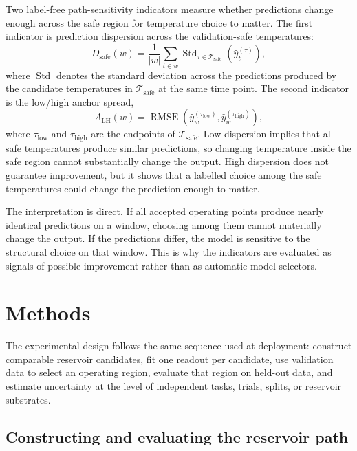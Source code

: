 \documentclass[11pt,a4paper]{article}
\begin{document}
Two label-free path-sensitivity indicators measure whether predictions change enough across the safe region for temperature choice to matter. The first indicator is prediction dispersion across the validation-safe temperatures:
\begin{equation}
  D_{\mathrm{safe}}(w)=
  \frac{1}{|w|}\sum_{t\in w}
  \operatorname{Std}_{\tau\in\mathcal{T}_{\mathrm{safe}}}
  \left(\widehat y_t^{(\tau)}\right),
\end{equation}
where $\operatorname{Std}$ denotes the standard deviation across the predictions produced by the candidate temperatures in $\mathcal{T}_{\mathrm{safe}}$ at the same time point. The second indicator is the low/high anchor spread,
\begin{equation}
  A_{\mathrm{LH}}(w)=
  \operatorname{RMSE}\left(
  \widehat y_{w}^{(\tau_{\mathrm{low}})},
  \widehat y_{w}^{(\tau_{\mathrm{high}})}
  \right),
\end{equation}
where $\tau_{\mathrm{low}}$ and $\tau_{\mathrm{high}}$ are the endpoints of $\mathcal{T}_{\mathrm{safe}}$. Low dispersion implies that all safe temperatures produce similar predictions, so changing temperature inside the safe region cannot substantially change the output. High dispersion does not guarantee improvement, but it shows that a labelled choice among the safe temperatures could change the prediction enough to matter.

The interpretation is direct. If all accepted operating points produce nearly identical predictions on a window, choosing among them cannot materially change the output. If the predictions differ, the model is sensitive to the structural choice on that window. This is why the indicators are evaluated as signals of possible improvement rather than as automatic model selectors.

\section{Methods}
\label{sec:methods}

The experimental design follows the same sequence used at deployment: construct comparable reservoir candidates, fit one readout per candidate, use validation data to select an operating region, evaluate that region on held-out data, and estimate uncertainty at the level of independent tasks, trials, splits, or reservoir substrates.

\subsection{Constructing and evaluating the reservoir path}
\label{sec:path_construction_methods}
\end{document}
